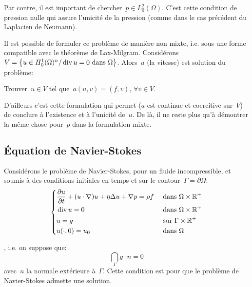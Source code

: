 Par contre, il est important de chercher~$p \in L^2_0(\Omega)$. C'est cette condition de pression nulle qui assure l'unicité de la pression (comme dans le cas précédent du Laplacien de Neumann).

\medskip
Il est possible de formuler ce problème de manière non mixte, i.e. sous une forme compatible avec le théorème de Lax-Milgram.
Considérons~$V=\left\{ u\in H^1_0(\Omega)^n / \operatorname{div} u=0 \text{ dans } \Omega\right\}$.
Alors~$u$ (la vitesse) est solution du problème:
\begin{center}
Trouver~$u\in V$ tel que~$a(u,v)=(f,v)$, $\forall v\in V$.
\end{center}
D'ailleurs c'est cette formulation qui permet ($a$ est continue et coercitive sur~$V$) de conclure à l'existence et à l'unicité de~$u$. De là, il ne reste plus qu'à démontrer la même chose pour~$p$ dans la formulation mixte.

\medskip
\subsection{Équation de Navier-Stokes}

Considérons le problème de Navier-Stokes, pour un fluide incompressible, et soumis à des conditions initiales en temps et sur le contour~$\Gamma=\partial\Omega$:
\begin{equation}\left\{
\begin{aligned}
&\dfrac{\partial u}{\partial t} + (u\cdot\nabla) u + \eta\Delta u + \nabla p = \rho f && \text{ dans } \Omega\times\mathbb R^+\\
&\operatorname{div} u = 0&& \text{ dans } \Omega\times\mathbb R^+\\
&u=g &&\text{ sur } \Gamma\times\mathbb R^+\\
&u(\cdot,0) =u_0 &&\text{ dans }\Omega
\end{aligned}\right.
\end{equation}

, i.e. on suppose que:
\begin{equation}
\dint_\Gamma g\cdot n %
= 0
\end{equation}
avec~$n$ la normale extérieure à~$\Gamma$. Cette condition est  pour que le problème de Navier-Stokes admette une solution.

